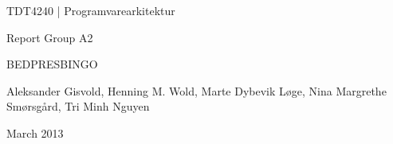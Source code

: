 \begin{titlepage}
\begin{center}
\vspace*{1in}
{\LARGE TDT4240 | Programvarearkitektur}
\par
\vspace{1in}
{\LARGE Report Group A2}
\par
\vspace{1in}
{\LARGE BEDPRESBINGO} %
\par
\vfill
\par
\vspace{0.5in}
Aleksander Gisvold, Henning M. Wold, Marte Dybevik Løge, Nina Margrethe Smørsgård, Tri Minh Nguyen
\par
March 2013 %
\end{center}
\end{titlepage}
